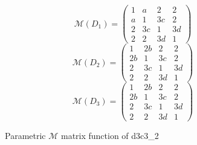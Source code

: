 \documentclass[12pt,a4paper]{article}
\theoremstyle{plain}%
\theoremstyle{definition}
\theoremstyle{remark}
\begin{document}
\begin{figure}
  \caption{\label{fig:d3c3_2_pm} Parametric $\mathcal{M}$ matrix function of d3c3\_2}
  \begin{equation*}
    \mathcal{M}(D_1)=
    \left(
    \begin{array}{cccc}
      1 & a & 2 & 2\\
      a & 1 & 3c & 2\\
      2 & 3c & 1 & 3d\\
      2 & 2 & 3d & 1
    \end{array}
    \right)
  \end{equation*}
  \begin{equation*}
    \mathcal{M}(D_2)=
    \left(
    \begin{array}{cccc}
      1 & 2b & 2 & 2\\
      2b & 1 & 3c & 2\\
      2 & 3c & 1 & 3d\\
      2 & 2 & 3d & 1
    \end{array}
    \right)
  \end{equation*}
  \begin{equation*}
    \mathcal{M}(D_3)=
    \left(
    \begin{array}{cccc}
      1 & 2b & 2 & 2\\
      2b & 1 & 3c & 2\\
      2 & 3c & 1 & 3d\\
      2 & 2 & 3d & 1
    \end{array}
    \right)
  \end{equation*}
\end{figure}
\end{document}

